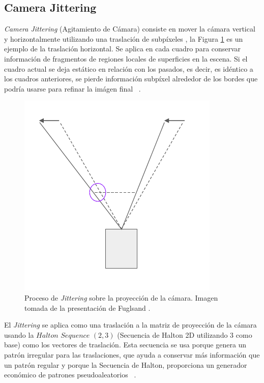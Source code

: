 \documentclass[pregrado]{tesis-usb} %
\begin{document}
\subsection{Camera Jittering}
\textit{Camera Jittering} (Agitamiento de Cámara) consiste en mover la cámara vertical y horizontalmente utilizando una traslación de subpíxeles \cite{Fuglsand2016,XU2016}, la Figura \ref{fig:camerajittering} es un ejemplo de la traslación horizontal. Se aplica en cada cuadro para conservar información de fragmentos de regiones locales de superficies en la escena. Si el cuadro actual se deja estático en relación con los pasados, es decir, es idéntico a los cuadros anteriores, se pierde información subpíxel alrededor de los bordes que podría usarse para refinar la imágen final ~\cite{Fuglsand2016, XU2016}.  

\begin{figure}[!hbt]
	\centering
	\includegraphics[scale=0.3]{images/camera_jitter.png}
	\caption{Proceso de \textit{Jittering} sobre la proyección de la cámara. Imagen tomada de la presentación de Fuglsand \protect\cite{Fuglsand2016}.} \label{fig:camerajittering}
\end{figure}

El \textit{Jittering} se aplica como una traslación a la matriz de proyección de la cámara usando la $Halton$ $Sequence$ $(2,3)$ (Secuencia de Halton 2D utilizando 3 como base) como los vectores de traslación. Esta secuencia se usa porque genera un patrón irregular para las traslaciones, que ayuda a conservar más información que un patrón regular y porque la Secuencia de Halton, proporciona un generador económico de patrones pseudoaleatorios ~\cite{Fuglsand2016, XU2016}. 
\end{document}
